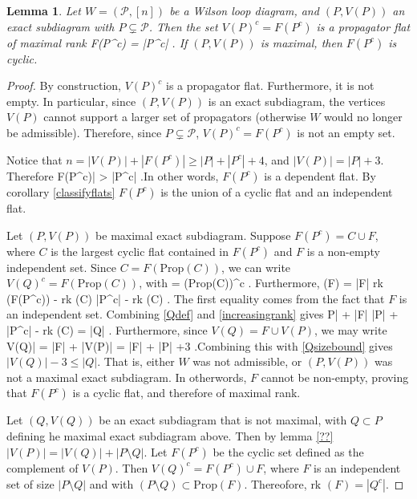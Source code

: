 \documentclass[11pt]{article}
\newcommand{\rk}{\textrm{rk }}
\def\ba #1\ea{\begin{align} #1 \end{align}}
\def\bas #1\eas{\begin{align*} #1 \end{align*}}
\newcommand{\cP}{\mathcal{P}}
\newcommand{\Prop}{\textrm{Prop}}
\newtheorem{lem}[thm]{Lemma}
\theoremstyle{remark}
\theoremstyle{definition}
\begin{document}
\begin{lem} \label{maxexactcomplementrank}
Let $W = (\cP, [n])$ be a Wilson loop diagram, and $(P, V(P))$ an exact subdiagram with $P \subsetneq \cP$. Then the set $V(P)^c = F(P^c)$ is a propagator flat of maximal rank  \bas \rk F(P^c) = |P^c| \;. \eas If $(P, V(P))$ is maximal, then $F(P^c)$ is cyclic.
\end{lem}

\begin{proof}
By construction, $V(P)^c$ is a propagator flat. Furthermore, it is not empty. In particular, since $(P, V(P))$ is an exact subdiagram, the vertices $V(P)$ cannot support a larger set of propagators (otherwise $W$ would no longer be admissible). Therefore, since $P \subsetneq \cP$, $V(P)^c = F(P^c)$ is not an empty set. 

Notice that $n= |V(P)| + |F(P^c)| \geq |P| + |P^c| +4$, and $|V(P)| = |P| +3$. Therefore \bas |F(P^c)| > |P^c| \;.\eas In other words, $F(P^c)$ is a dependent flat. By corollary \ref{classifyflats} $F(P^c)$ is the union of a cyclic flat and an independent flat. 

Let $(P, V(P))$ be maximal exact subdiagram. Suppose $F(P^c) = C \cup F$, where $C$ is the largest cyclic flat contained in $F(P^c)$ and $F$ is a non-empty independent set. Since $C = F(\Prop(C))$, we can write $V(Q)^c = F(\Prop(C))$, with \ba Q = (\Prop(C))^c \label{Qdef}\;. \ea Furthermore, \ba \rk(F) = |F| \leq \rk(F(P^c)) - \rk(C)  \leq |P^c| - \rk(C) \;. \label{increasingrank}\ea The first equality comes from the fact that $F$ is an independent set. Combining \eqref{Qdef} and \eqref{increasingrank} gives \ba |P| + |F| \leq |P| + |P^c| - \rk(C) = |Q| \;. \label{Qsizebound}\ea Furthermore, since $V(Q) = F \cup V(P)$, we may write  \ba |V(Q)| = |F| + |V(P)| = |F| + |P| +3 \label{VQsize} \;.\ea Combining this with \eqref{Qsizebound} gives $|V(Q)| - 3 \leq |Q|$. That is, either $W$ was not admissible, or $(P,V(P))$ was not a maximal exact subdiagram. In otherwords, $F$ cannot be non-empty, proving that $F(P^c)$ is a cyclic flat, and therefore of maximal rank.

Let $(Q, V(Q))$ be an exact subdiagram that is not maximal, with $Q \subset P$ defining he maximal exact subdiagram above. Then by lemma \ref{??} $|V(P)| = |V(Q)| + |P \setminus Q|$. Let $F(P^c)$ be the cyclic set defined as the complement of $V(P)$. Then $V(Q)^c = F(P^c) \cup F$, where $F$ is an independent set of size $|P \setminus Q|$ and with $(P \setminus Q) \subset \Prop (F)$. Thereofore, $\rk (F) = |Q^c|$. 
\end{proof}
\end{document}
